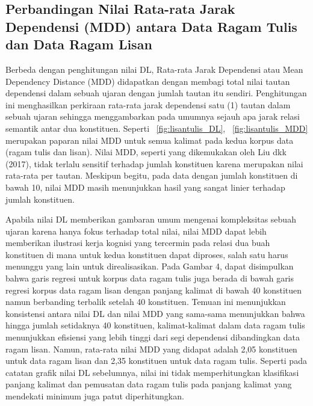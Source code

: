 \subsection{Perbandingan Nilai Rata-rata Jarak Dependensi (MDD) antara Data Ragam Tulis dan Data Ragam Lisan}
Berbeda dengan penghitungan nilai DL, Rata-rata Jarak Dependensi atau Mean Dependency Distance (MDD) didapatkan dengan membagi total nilai tautan dependensi dalam sebuah ujaran dengan jumlah tautan itu sendiri. Penghitungan ini menghasilkan perkiraan rata-rata jarak dependensi satu (1) tautan dalam sebuah ujaran sehingga menggambarkan pada umumnya sejauh apa jarak relasi semantik antar dua konstituen. Seperti \pic~\ref{fig:lisantulis_DL}, \pic~\ref{fig:lisantulis_MDD} merupakan paparan nilai MDD untuk semua kalimat pada kedua korpus data (ragam tulis dan lisan). Nilai MDD, seperti yang dikemukakan oleh Liu dkk (2017), tidak terlalu sensitif terhadap jumlah konstituen karena merupakan nilai rata-rata per tautan. Meskipun begitu, pada data dengan jumlah konstituen di bawah 10, nilai MDD masih menunjukkan hasil yang sangat linier terhadap jumlah konstituen. 

Apabila nilai DL memberikan gambaran umum mengenai kompleksitas sebuah ujaran karena hanya fokus terhadap total nilai, nilai MDD dapat lebih memberikan ilustrasi kerja kognisi yang tercermin pada relasi dua buah konstituen di mana untuk kedua konstituen dapat diproses, salah satu harus menunggu yang lain untuk direalisasikan. Pada Gambar 4, dapat disimpulkan bahwa garis regresi untuk korpus data ragam tulis juga berada di bawah garis regresi korpus data ragam lisan dengan panjang kalimat di bawah 40 konstituen namun berbanding terbalik setelah 40 konstituen. Temuan ini menunjukkan konsistensi antara nilai DL dan nilai MDD yang sama-sama menunjukkan bahwa hingga jumlah setidaknya 40 konstituen, kalimat-kalimat dalam data ragam tulis menunjukkan efisiensi yang lebih tinggi dari segi dependensi dibandingkan data ragam lisan. Namun, rata-rata nilai MDD yang didapat adalah 2,05 konstituen untuk data ragam lisan dan 2,35 konstituen untuk data ragam tulis. Seperti pada catatan grafik nilai DL sebelumnya, nilai ini tidak memperhitungkan klasifikasi panjang kalimat dan pemusatan data ragam tulis pada panjang kalimat yang mendekati minimum juga patut diperhitungkan.

